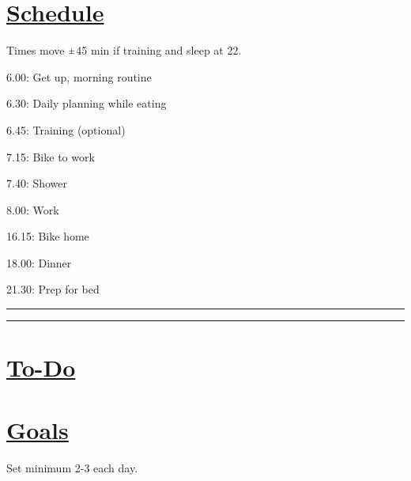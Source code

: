 \documentclass[11pt]{article}
\newcommand{\rpm}{\raisebox{.2ex}{$\scriptstyle\pm$}}
\begin{document}
\begin{multicols}{2}

\section*{\underline{Schedule}} 
Times move $\rpm$45 min if training and sleep at 22. 
  \begin{todolist}[itemsep=8pt]
    \item 6.00: Get up, morning routine
	\item 6.30: Daily planning while eating   
    \item 6.45: Training (optional)
    \item 7.15: Bike to work
    \item 7.40: Shower
    \item 8.00: Work
    \item 16.15: Bike home 
    \item     
    \item 18.00: Dinner
    \item 21.30: Prep for bed
  \end{todolist}

\begin{flushleft}
\rule{122pt}{1pt}\vline\rule{122pt}{1pt}
\end{flushleft}


\section*{\underline{To-Do}}
  \begin{todolist}[itemsep=8pt]
    \item 
    \item 
    \item 
    \item 
    \item 
  \end{todolist}

\columnbreak

\section*{\underline{Goals}}
Set minimum 2-3 each day.
  \begin{todolist}[itemsep=8pt]
    \item 
    \item 
    \item 
    \item 
    \item 
  \end{todolist}


\end{multicols}
\end{document}
